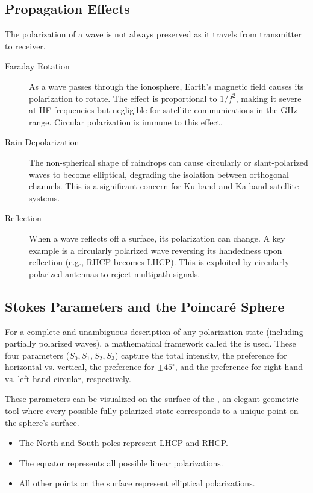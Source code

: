 \subsection{Propagation Effects}

The polarization of a wave is not always preserved as it travels from transmitter to receiver.
\begin{description}
    \item[Faraday Rotation] As a wave passes through the ionosphere, Earth's magnetic field causes its polarization to rotate. The effect is proportional to $1/f^2$, making it severe at HF frequencies but negligible for satellite communications in the GHz range. Circular polarization is immune to this effect.
    \item[Rain Depolarization] The non-spherical shape of raindrops can cause circularly or slant-polarized waves to become elliptical, degrading the isolation between orthogonal channels. This is a significant concern for Ku-band and Ka-band satellite systems.
    \item[Reflection] When a wave reflects off a surface, its polarization can change. A key example is a circularly polarized wave reversing its handedness upon reflection (e.g., RHCP becomes LHCP). This is exploited by circularly polarized antennas to reject multipath signals.
\end{description}


\subsection{Stokes Parameters and the Poincaré Sphere}

For a complete and unambiguous description of any polarization state (including partially polarized waves), a mathematical framework called the  is used. These four parameters ($S_0, S_1, S_2, S_3$) capture the total intensity, the preference for horizontal vs. vertical, the preference for $\pm45^\circ$, and the preference for right-hand vs. left-hand circular, respectively.

These parameters can be visualized on the surface of the , an elegant geometric tool where every possible fully polarized state corresponds to a unique point on the sphere's surface.
\begin{itemize}
    \item The North and South poles represent LHCP and RHCP.
    \item The equator represents all possible linear polarizations.
    \item All other points on the surface represent elliptical polarizations.
\end{itemize}


